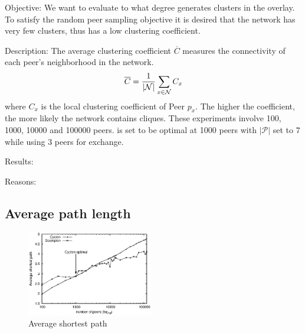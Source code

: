 \begin{asparadesc}
\item[Objective:]
    We want to evaluate to what degree \SCAMPLON{} generates clusters in the overlay.
    To satisfy the random peer sampling objective it is desired that the network has very few clusters,
    thus has a low clustering coefficient.
\item[Description:] 
    The average clustering coefficient $\overline{C}$  measures the connectivity of each peer's neighborhood in the network.
  \begin{equation}
    \overline{C} = {1\over |\mathcal{N}|}\sum\limits_{x\in\mathcal{N}}C_x
    \end{equation}
    where $C_x$ is the local clustering coefficient of Peer $p_x$. The higher
    the coefficient, the more likely the network contains cliques. These
    experiments involve 100, 1000, 10000 and 100000 peers. \CYCLON{} is set to be optimal
    at 1000 peers with $|\mathcal{P}|$ set to $7$ while using $3$ peers for exchange.


\item[Results:]



\item[Reasons:]

    

\end{asparadesc}



\subsection{Average path length}

\begin{figure}
    \centering
    \includegraphics[width=0.49\textwidth]{img/avgpath.eps}
    \caption{Average shortest path}
    \label{fig:avgpath}
\end{figure}

